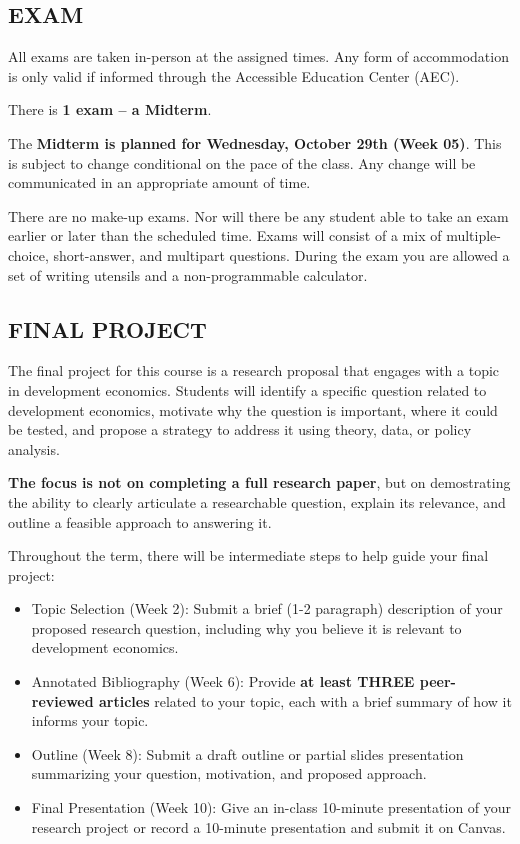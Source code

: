 \documentclass[11pt]{article}
\begin{document}
\subsection*{EXAM}
All exams are taken in-person at the assigned times. 
Any form of accommodation is only valid if informed through the Accessible Education Center (AEC).

There is \textbf{1 exam -- a Midterm}. 

The \textbf{Midterm is planned for Wednesday, October 29th (Week 05)}. 
This is subject to change conditional on the pace of the class.
Any change will be communicated in an appropriate amount of time. 

There are no make-up exams. 
Nor will there be any student able to take an exam earlier or later than the scheduled time. 
Exams will consist of a mix of multiple-choice, short-answer, and multipart questions. 
During the exam you are allowed a set of writing utensils and a non-programmable calculator. 

\subsection*{FINAL PROJECT}
The final project for this course is a research proposal that engages with a topic in development economics. 
Students will identify a specific question related to development economics, motivate why the question is important, where it could be tested, and propose a strategy to address it using theory, data, or policy analysis. 

\textbf{The focus is not on completing a full research paper}, but on demostrating the ability to clearly articulate a researchable question, explain its relevance, and outline a feasible approach to answering it.

Throughout the term, there will be intermediate steps to help guide your final project:

\begin{itemize}
    \item Topic Selection (Week 2): Submit a brief (1-2 paragraph) description of your proposed research question, including why you believe it is relevant to development economics.
    \item Annotated Bibliography (Week 6): Provide \textbf{at least THREE peer-reviewed articles} related to your topic, each with a brief summary of how it informs your topic. 
    \item Outline (Week 8): Submit a draft outline or partial slides presentation summarizing your question, motivation, and proposed approach. 
    \item Final Presentation (Week 10): Give an in-class 10-minute presentation of your research project or record a 10-minute presentation and submit it on Canvas. 
\end{itemize}
\end{document}

